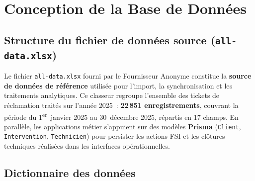\documentclass[10pt,a4paper]{report}
\begin{document}
\section{Conception de la Base de Données}

\subsection{Structure du fichier de données source (\texttt{all-data.xlsx})}

Le fichier \texttt{all-data.xlsx} fourni par le Fournisseur Anonyme constitue la \textbf{source de données de référence} utilisée pour l'import, la synchronisation et les traitements analytiques. Ce classeur regroupe l'ensemble des tickets de réclamation traités sur l'année 2025~: \textbf{22\,851 enregistrements}, couvrant la période du 1\textsuperscript{er}~janvier 2025 au 30~décembre 2025, répartis en 17 champs. En parallèle, les applications métier s'appuient sur des modèles \textbf{Prisma} (\texttt{Client}, \texttt{Intervention}, \texttt{Technicien}) pour persister les actions FSI et les clôtures techniques réalisées dans les interfaces opérationnelles.

\subsection{Dictionnaire des données}
\end{document}
